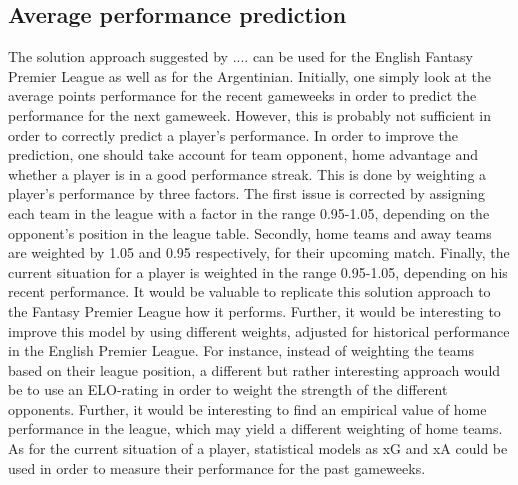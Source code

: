 \subsection{Average performance prediction}
The solution approach suggested by .... can be used for the English Fantasy Premier League as well as for the Argentinian. Initially, one simply look at the average points performance for the recent gameweeks in order to predict the performance for the next gameweek. However, this is probably not sufficient in order to correctly predict a player's performance. In order to improve the prediction, one should take account for team opponent, home advantage and whether a player is in a good performance streak. This is done by weighting a player's performance by three factors. The first issue is corrected by assigning each team in the league with a factor in the range 0.95-1.05, depending on the opponent's position in the league table. Secondly, home teams and away teams are weighted by 1.05 and 0.95 respectively, for their upcoming match. Finally, the current situation for a player is weighted in the range 0.95-1.05, depending on his recent performance. 
\newpar
It would be valuable to replicate this solution approach to the Fantasy Premier League how it performs. Further, it would be interesting to improve this model by using different weights, adjusted for historical performance in the English Premier League. For instance, instead of weighting the teams based on their league position, a different but rather interesting approach would be to use an ELO-rating in order to weight the strength of the different opponents. Further, it would be interesting to find an empirical value of home performance in the league, which may yield a different weighting of home teams. As for the current situation of a player, statistical models as xG and xA could be used in order to measure their performance for the past gameweeks.
